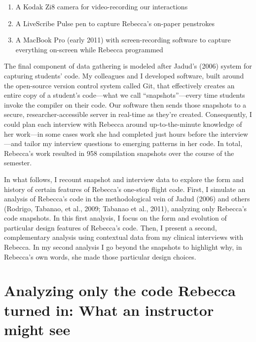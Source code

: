 \begin{enumerate}
\def\labelenumi{\arabic{enumi}.}
\tightlist
\item
  A Kodak Zi8 camera for video-recording our interactions
\item
  A LiveScribe Pulse pen to capture Rebecca's on-paper penstrokes
\item
  A MacBook Pro (early 2011) with screen-recording software to capture everything on-screen while Rebecca programmed
\end{enumerate}

The final component of data gathering is modeled after Jadud's (2006) system for capturing students' code. My colleagues and I developed software, built around the open-source version control system called Git, that effectively creates an entire copy of a student's code---what we call ``snapshots''---every time students invoke the compiler on their code. Our software then sends those snapshots to a secure, researcher-accessible server in real-time as they're created. Consequently, I could plan each interview with Rebecca around up-to-the-minute knowledge of her work---in some cases work she had completed just hours before the interview---and tailor my interview questions to emerging patterns in her code. In total, Rebecca's work resulted in 958 compilation snapshots over the course of the semester.

In what follows, I recount snapshot and interview data to explore the form and history of certain features of Rebecca's one-stop flight code. First, I simulate an analysis of Rebecca's code in the methodological vein of Jadud (2006) and others (Rodrigo, Tabanao, et al., 2009; Tabanao et al., 2011), analyzing only Rebecca's code snapshots. In this first analysis, I focus on the form and evolution of particular design features of Rebecca's code. Then, I present a second, complementary analysis using contextual data from my clinical interviews with Rebecca. In my second analysis I go beyond the snapshots to highlight why, in Rebecca's own words, she made those particular design choices.

\section{Analyzing only the code Rebecca turned in: What an instructor might see}\label{analyzing-only-the-code-rebecca-turned-in-what-an-instructor-might-see}


